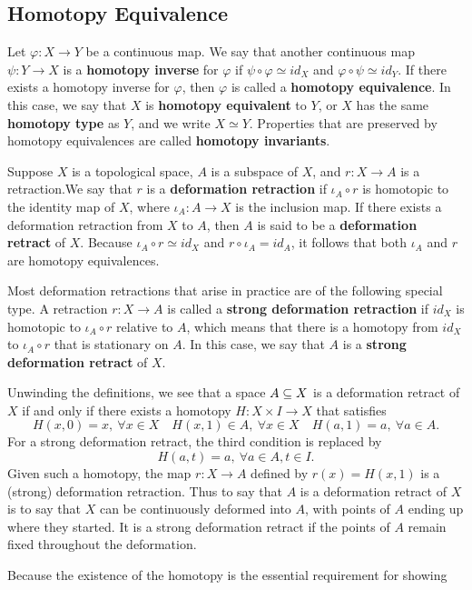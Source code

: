 \subsection{Homotopy Equivalence}
Let $\varphi:X\to Y$ be a continuous map. We say that another continuous map
$\psi:Y\to X$ is a \textbf{homotopy inverse} for $\varphi$ if $\psi\circ\varphi\simeq id_X$ and $\varphi\circ\psi\simeq id_Y$. If there exists a homotopy inverse for $\varphi$, then $\varphi$ is called a \textbf{homotopy equivalence}. In this case, we say that $X$ is \textbf{homotopy equivalent} to $Y$, or $X$ has the same \textbf{homotopy type}
as $Y$, and we write $X\simeq Y$. Properties that are preserved by homotopy equivalences are called \textbf{homotopy invariants}.\par
Suppose $X$ is a topological space, $A$ is a subspace of $X$, and $r:X\to A$ is a retraction.We say that $r$ is a \textbf{deformation retraction} if $\iota_A\circ r$ is homotopic to the identity map of $X$, where $\iota_A:A\to X$ is the inclusion map. If there exists a deformation retraction from $X$ to $A$, then $A$ is said to be a \textbf{deformation retract} of $X$. Because $\iota_A\circ r\simeq id_X$ and $r\circ\iota_A=id_A$, it follows that both $\iota_A$ and $r$ are homotopy equivalences.\par
Most deformation retractions that arise in practice are of the following special type. A retraction $r:X\to A$ is called a \textbf{strong deformation retraction} if $id_X$ is homotopic to $\iota_A\circ r$ relative to $A$, which means that there is a homotopy from $id_X$ to $\iota_A\circ r$ that is stationary on $A$. In this case, we say that $A$ is a \textbf{strong deformation retract} of $X$.\par
Unwinding the definitions, we see that a space $A\subseteq X$ is a deformation retract of $X$ if and only if there exists a homotopy $H:X\times I\to X$ that satisfies
\[H(x,0)=x,\ \forall x\in X\quad H(x,1)\in A,\ \forall x\in X\quad H(a,1)=a,\ \forall a\in A.\]
For a strong deformation retract, the third condition is replaced by
\[H(a,t)=a,\ \forall a\in A, t\in I.\]
Given such a homotopy, the map $r:X\to A$ defined by $r(x)=H(x,1)$ is a (strong) deformation retraction. Thus to say that $A$ is a deformation retract of $X$ is to say that $X$ can be continuously deformed into $A$, with points of $A$ ending up where they started. It is a strong deformation retract if the points of $A$ remain fixed throughout the deformation.\par
Because the existence of the homotopy is the essential requirement for showing
